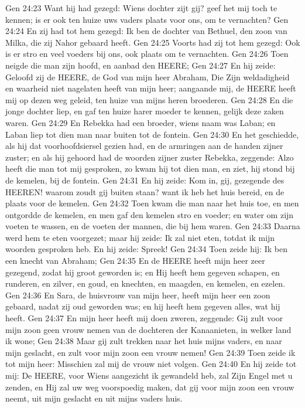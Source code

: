 Gen 24:23  Want hij had gezegd: Wiens dochter zijt gij? geef het mij toch te kennen; is er ook ten huize uws vaders plaats voor ons, om te vernachten?
Gen 24:24  En zij had tot hem gezegd: Ik ben de dochter van Bethuel, den zoon van Milka, die zij Nahor gebaard heeft.
Gen 24:25  Voorts had zij tot hem gezegd: Ook is er stro en veel voeders bij ons, ook plaats om te vernachten.
Gen 24:26  Toen neigde die man zijn hoofd, en aanbad den HEERE;
Gen 24:27  En hij zeide: Geloofd zij de HEERE, de God van mijn heer Abraham, Die Zijn weldadigheid en waarheid niet nagelaten heeft van mijn heer; aangaande mij, de HEERE heeft mij op dezen weg geleid, ten huize van mijns heren broederen.
Gen 24:28  En die jonge dochter liep, en gaf ten huize harer moeder te kennen, gelijk deze zaken waren.
Gen 24:29  En Rebekka had een broeder, wiens naam was Laban; en Laban liep tot dien man naar buiten tot de fontein.
Gen 24:30  En het geschiedde, als hij dat voorhoofdsiersel gezien had, en de armringen aan de handen zijner zuster; en als hij gehoord had de woorden zijner zuster Rebekka, zeggende: Alzo heeft die man tot mij gesproken, zo kwam hij tot dien man, en ziet, hij stond bij de kemelen, bij de fontein.
Gen 24:31  En hij zeide: Kom in, gij, gezegende des HEEREN! waarom zoudt gij buiten staan? want ik heb het huis bereid, en de plaats voor de kemelen.
Gen 24:32  Toen kwam die man naar het huis toe, en men ontgordde de kemelen, en men gaf den kemelen stro en voeder; en water om zijn voeten te wassen, en de voeten der mannen, die bij hem waren.
Gen 24:33  Daarna werd hem te eten voorgezet; maar hij zeide: Ik zal niet eten, totdat ik mijn woorden gesproken heb. En hij zeide: Spreek!
Gen 24:34  Toen zeide hij: Ik ben een knecht van Abraham;
Gen 24:35  En de HEERE heeft mijn heer zeer gezegend, zodat hij groot geworden is; en Hij heeft hem gegeven schapen, en runderen, en zilver, en goud, en knechten, en maagden, en kemelen, en ezelen.
Gen 24:36  En Sara, de huisvrouw van mijn heer, heeft mijn heer een zoon gebaard, nadat zij oud geworden was; en hij heeft hem gegeven alles, wat hij heeft.
Gen 24:37  En mijn heer heeft mij doen zweren, zeggende: Gij zult voor mijn zoon geen vrouw nemen van de dochteren der Kanaanieten, in welker land ik wone;
Gen 24:38  Maar gij zult trekken naar het huis mijns vaders, en naar mijn geslacht, en zult voor mijn zoon een vrouw nemen!
Gen 24:39  Toen zeide ik tot mijn heer: Misschien zal mij de vrouw niet volgen.
Gen 24:40  En hij zeide tot mij: De HEERE, voor Wiens aangezicht ik gewandeld heb, zal Zijn Engel met u zenden, en Hij zal uw weg voorspoedig maken, dat gij voor mijn zoon een vrouw neemt, uit mijn geslacht en uit mijns vaders huis.

